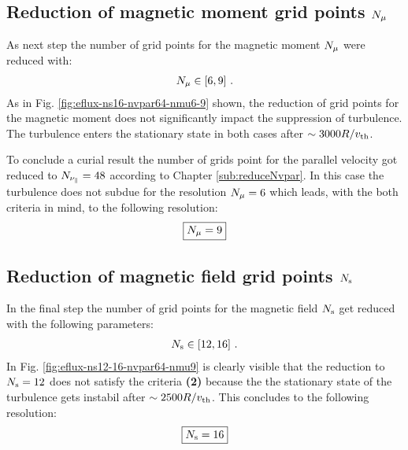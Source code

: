 
\subsection{Reduction of magnetic moment grid points $N_\mu$}
\label{sub:reduceNmu}

As next step the number of grid points for the magnetic moment $N_\mu$ were reduced with:
\begin{gather*}
	N_\mu \in [6, 9] ~.
\end{gather*}
As in Fig. \ref{fig:eflux-ns16-nvpar64-nmu6-9} shown, the reduction of grid points for the magnetic moment does not significantly impact the suppression of turbulence. The turbulence enters the stationary state in both cases after $\sim 3000 R/v_{\mathrm{th}}$.  


To conclude a curial result the number of grids point for the parallel velocity got reduced to $N_{\nu_\parallel} = 48$ according to Chapter \ref{sub:reduceNvpar}. In this case the turbulence does not subdue for the resolution $N_\mu = 6$ which leads, with the both criteria in mind, to the following resolution:
\begin{gather*}
	\boxed{N_\mu = 9}
\end{gather*}


\subsection{Reduction of magnetic field grid points $N_\mathrm{s}$}
\label{sub:reduceNs}

In the final step the number of grid points for the magnetic field $N_\mathrm{s}$ get reduced with the following parameters:
\begin{gather*}
	N_\mathrm{s} \in [12, 16]~.
\end{gather*}
In Fig. \ref{fig:eflux-ns12-16-nvpar64-nmu9} is clearly visible that the reduction to $N_\mathrm{s} = 12$ does not satisfy the criteria \textbf{(2)} because the the stationary state of the turbulence gets instabil after $\sim 2500 R/v_{\mathrm{th}}$. This concludes to the following resolution:
\begin{gather*}
	\boxed{N_\mathrm{s} = 16}
\end{gather*}

